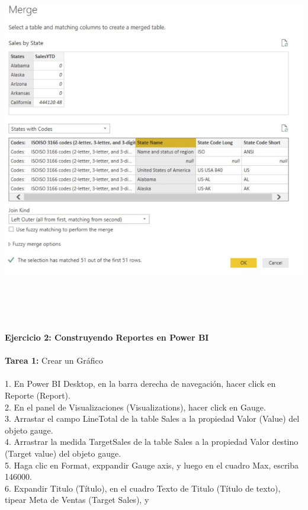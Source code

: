 \documentclass[12pt,letterpaper]{article}
\begin{document}
\begin{flushleft}
\begin{itemize}
\textbf{ }\\
\begin{center}
	\includegraphics[width=15cm]{./Imagenes/image33} 
	\end{center}
\textbf{ }\\
\textbf{ }\\
\textbf{ }\\
\textbf{ }\\
\textbf{Ejercicio 2: Construyendo Reportes en Power BI}\\
\textbf{ }\\
\textbf{Tarea 1: } Crear un Gráfico\\
\textbf{ }\\
1. En Power BI Desktop, en la barra derecha de navegación, hacer click en Reporte (Report).\\
2. En el panel de Visualizaciones (Visualizations), hacer click en Gauge.\\
3. Arrastar el campo LineTotal de la table Sales a la propiedad Valor (Value) del objeto gauge.\\
4. Arrastrar la medida TargetSales de la table Sales a la propiedad Valor destino (Target value) del objeto
gauge.\\
5. Haga clic en Format, exppandir Gauge axis, y luego en el cuadro Max, escriba 146000.\\
6. Expandir Titulo (Título), en el cuadro Texto de Titulo (Título de texto), tipear Meta de Ventas (Target Sales), y

\end{itemize}
\end{flushleft}
\end{document}

